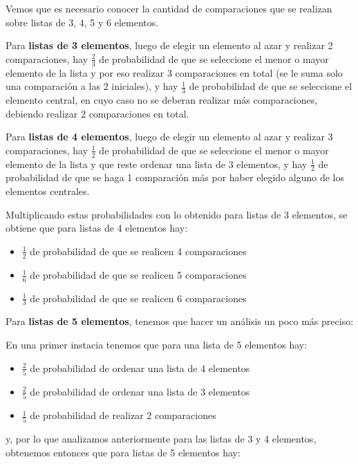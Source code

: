\documentclass[11pt]{article}
\begin{document}
Vemos que es necesario conocer la cantidad de comparaciones que se realizan sobre listas de 3, 4, 5 y 6 elementos.

Para \textbf{listas de 3 elementos}, luego de elegir un elemento al azar y realizar 2 comparaciones, hay $\frac{2}{3}$ de probabilidad de que se seleccione el menor o mayor elemento de la lista y por eso realizar 3 comparaciones en total (se le suma solo una comparación a las 2 iniciales), y hay $\frac{1}{3}$ de probabilidad de que se seleccione el elemento central, en cuyo caso no se deberan realizar más comparaciones, debiendo realizar 2 comparaciones en total.

Para \textbf{listas de 4 elementos}, luego de elegir un elemento al azar y realizar 3 comparaciones, hay $\frac{1}{2}$ de probabilidad de que se seleccione el menor o mayor elemento de la lista y que reste ordenar una lista de 3 elementos, y hay $\frac{1}{2}$ de probabilidad de que se haga 1 comparación más por haber elegido alguno de los elementos centrales.

Multiplicando estas probabilidades con lo obtenido para listas de 3 elementos, se obtiene que para listas de 4 elementos hay:

\begin{itemize}
    \item $\frac{1}{2}$ de probabilidad de que se realicen 4 comparaciones
    \item $\frac{1}{6}$ de probabilidad de que se realicen 5 comparaciones
    \item $\frac{1}{3}$ de probabilidad de que se realicen 6 comparaciones
\end{itemize}

Para \textbf{listas de 5 elementos}, tenemos que hacer un análisis un poco más preciso: 

En una primer instacia tenemos que para una lista de 5 elementos hay: 

\begin{itemize}
    \item $\frac{2}{5}$ de probabilidad de ordenar una lista de 4 elementos
    \item $\frac{2}{5}$ de probabilidad de ordenar una lista de 3 elementos
    \item $\frac{1}{5}$ de probabilidad de realizar 2 comparaciones
\end{itemize}

y, por lo que analizamos anteriormente para las listas de 3 y 4 elementos, obtenemos entonces que para listas de 5 elementos hay: 
\end{document}
